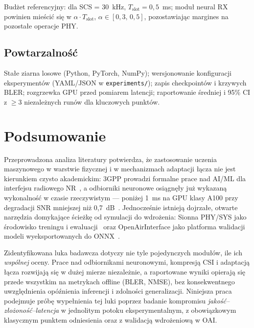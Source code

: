 \documentclass[12pt, a4paper]{article}
\begin{document}
Budżet referencyjny: dla SCS = 30~kHz, $T_{\mathrm{slot}} = 0{,}5$~ms; moduł neural RX powinien mieścić się w $\alpha \cdot T_{\mathrm{slot}}$, $\alpha \in [0{,}3,\,0{,}5]$, pozostawiając margines na pozostałe operacje PHY.

\subsection{Powtarzalność}

Stałe ziarna losowe (Python, PyTorch, NumPy); wersjonowanie konfiguracji eksperymentów (YAML/JSON w \texttt{experiments/}); zapis checkpointów i krzywych BLER; rozgrzewka GPU przed pomiarem latencji; raportowanie średniej i 95\% CI z $\geq 3$ niezależnych runów dla kluczowych punktów.

\section{Podsumowanie}

Przeprowadzona analiza literatury potwierdza, że zastosowanie uczenia maszynowego w warstwie fizycznej i w mechanizmach adaptacji łącza nie jest kierunkiem czysto akademickim: 3GPP prowadzi formalne prace nad AI/ML dla interfejsu radiowego NR~\cite{3gpp-38843}, a odbiorniki neuronowe osiągnęły już wykazaną wykonalność w czasie rzeczywistym --- poniżej 1~ms na GPU klasy A100 przy degradacji SNR mniejszej niż 0,7~dB~\cite{arxiv-2409-02912}. Jednocześnie istnieją dojrzałe, otwarte narzędzia domykające ścieżkę od symulacji do wdrożenia: Sionna PHY/SYS jako środowisko treningu i ewaluacji~\cite{sionna-phy,sionna-sys} oraz OpenAirInterface jako platforma walidacji modeli wyeksportowanych do ONNX~\cite{oai,sionna-rk,cheng-oai-csi-2024}.

Zidentyfikowana luka badawcza dotyczy nie tyle pojedynczych modułów, ile ich \emph{wspólnej} oceny. Prace nad odbiornikami neuronowymi, kompresją CSI i adaptacją łącza rozwijają się w dużej mierze niezależnie, a raportowane wyniki opierają się przede wszystkim na metrykach offline (BLER, NMSE), bez konsekwentnego uwzględnienia opóźnienia inferencji i zdolności generalizacji. Niniejsza praca podejmuje próbę wypełnienia tej luki poprzez badanie kompromisu \emph{jakość--złożoność--latencja} w jednolitym potoku eksperymentalnym, z obowiązkowym klasycznym punktem odniesienia oraz z walidacją wdrożeniową w OAI.
\end{document}
